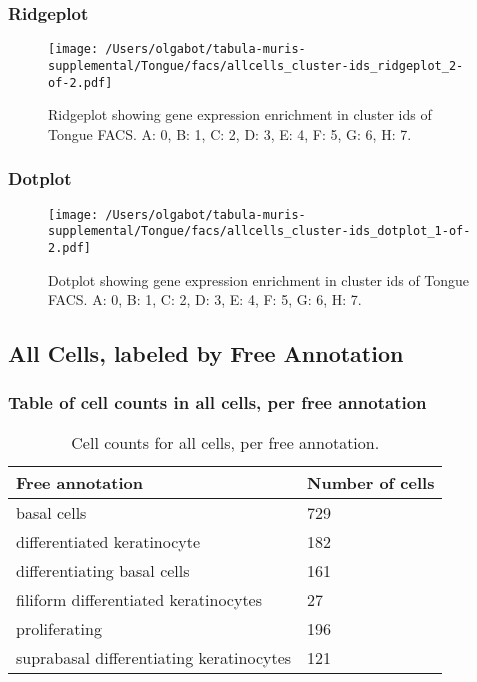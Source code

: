 \newpage
\newpage
\subsubsection{Ridgeplot}
\begin{figure}[h]
\centering
\texttt{[image: /Users/olgabot/tabula-muris-supplemental/Tongue/facs/allcells\_cluster-ids\_ridgeplot\_2-of-2.pdf]}

\caption{ Ridgeplot  showing gene expression enrichment in cluster ids of Tongue FACS. A: 0, B: 1, C: 2, D: 3, E: 4, F: 5, G: 6, H: 7.}
\end{figure}


\newpage
\newpage
\subsubsection{Dotplot}
\begin{figure}[h]
\centering
\texttt{[image: /Users/olgabot/tabula-muris-supplemental/Tongue/facs/allcells\_cluster-ids\_dotplot\_1-of-2.pdf]}

\caption{ Dotplot  showing gene expression enrichment in cluster ids of Tongue FACS. A: 0, B: 1, C: 2, D: 3, E: 4, F: 5, G: 6, H: 7.}
\end{figure}


\newpage
\subsection{All Cells, labeled by Free Annotation}
\subsubsection{Table of cell counts in all cells, per free annotation}\begin{table}[h]
\centering
\label{my-label}
\begin{tabular}{@{}ll@{}}
\toprule

Free annotation& Number of cells \\ \midrule
basal cells & 729 \\

differentiated keratinocyte & 182 \\

differentiating basal cells & 161 \\

filiform differentiated keratinocytes & 27 \\

proliferating & 196 \\

suprabasal differentiating keratinocytes & 121 \\
\bottomrule
\end{tabular}
\caption{Cell counts for all cells, per free annotation.}
\end{table}

